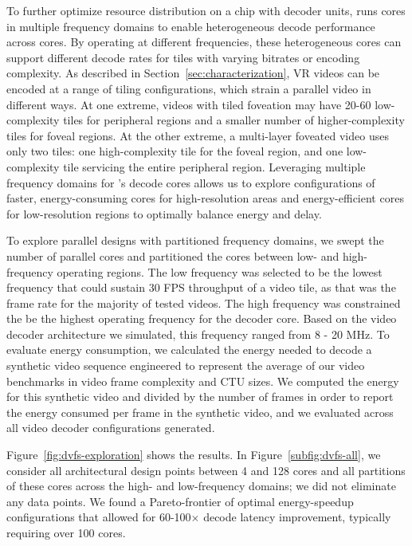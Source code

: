 To further optimize resource distribution on a chip with decoder units, \nameArch runs cores in multiple frequency domains to enable heterogeneous decode performance across cores.
By operating at different frequencies, these heterogeneous cores can support different decode rates for tiles with varying bitrates or encoding complexity.
As described in Section~\ref{sec:characterization}, VR videos can be encoded at a range of tiling configurations, which strain a parallel video in different ways.
At one extreme, videos with tiled foveation may have 20-60 low-complexity tiles for peripheral regions and a smaller number of higher-complexity tiles for foveal regions.
At the other extreme, a multi-layer foveated video uses only two tiles: one high-complexity tile for the foveal region, and one low-complexity tile servicing the entire peripheral region.
Leveraging multiple frequency domains for \nameArch's decode cores allows us to explore configurations of faster, energy-consuming cores for high-resolution areas and energy-efficient cores for low-resolution regions to optimally balance energy and delay.

To explore parallel designs with partitioned frequency domains, we swept the number of parallel cores and partitioned the cores between low- and high-frequency operating regions.
The low frequency was selected to be the lowest frequency that could sustain 30 FPS throughput of a video tile, as that was the frame rate for the majority of tested videos. The high frequency was constrained the be the highest operating frequency for the decoder core.
Based on the video decoder architecture we simulated, this frequency ranged from 8 - 20 MHz.
To evaluate energy consumption, we calculated the energy needed to decode a synthetic video sequence engineered to represent the average of our video benchmarks in video frame complexity and CTU sizes.
We computed the energy for this synthetic video and divided by the number of frames in order to report the energy consumed per frame in the synthetic video, and we evaluated across all video decoder configurations generated.

Figure~\ref{fig:dvfs-exploration} shows the results. In Figure~\ref{subfig:dvfs-all}, we consider all architectural design points between 4 and 128 cores and all partitions of these cores across the high- and low-frequency domains; we did not eliminate any data points.
We found a Pareto-frontier of optimal energy-speedup configurations that allowed for 60-100$\times$ decode latency improvement, typically requiring over 100 cores.

